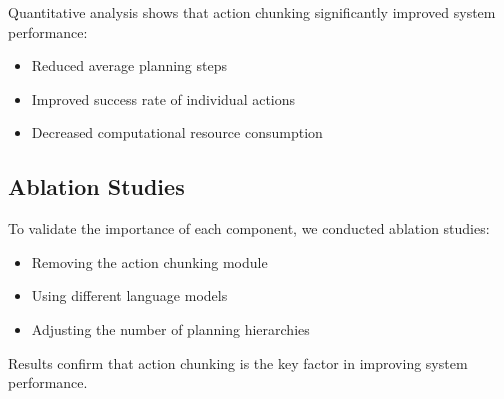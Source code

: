 \documentclass{article}
\begin{document}
Quantitative analysis shows that action chunking significantly improved system performance:

\begin{itemize}
    \item Reduced average planning steps
    \item Improved success rate of individual actions
    \item Decreased computational resource consumption
\end{itemize}

\subsection{Ablation Studies}

To validate the importance of each component, we conducted ablation studies:

\begin{itemize}
    \item Removing the action chunking module
    \item Using different language models
    \item Adjusting the number of planning hierarchies
\end{itemize}

Results confirm that action chunking is the key factor in improving system performance.







\end{document}
